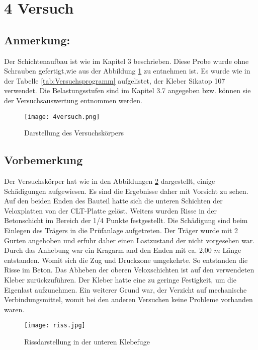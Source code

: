 \documentclass[12 pt,a4 paper ]{scrreprt}
\begin{document}
\clearpage
\newpage
\section{4 Versuch}

\subsection{Anmerkung:}
Der Schichtenaufbau ist wie im Kapitel 3 beschrieben. Diese Probe wurde ohne Schrauben gefertigt,wie aus der Abbildung \ref{4versuch} zu entnehmen ist. Es wurde wie in der Tabelle \ref{tab:Versuchsprogramm}  aufgelistet, der Kleber Sikatop 107 verwendet. Die Belastungsstufen sind im Kapitel 3.7 angegeben bzw. können sie der Versuchsauswertung entnommen werden.

\begin{figure}[h]
\begin{center}
\texttt{[image: 4versuch.png]}
\caption{Darstellung des Versuchskörpers}
\label{4versuch}
\end{center}
\end{figure}

\subsection{Vorbemerkung}

Der Versuchskörper hat wie in den Abbildungen \ref{riss} dargestellt, einige Schädigungen aufgewiesen. Es sind die Ergebnisse daher mit Vorsicht zu sehen. Auf den beiden Enden des Bauteil hatte sich die unteren Schichten der Veloxplatten von der CLT-Platte gelöst. Weiters wurden Risse in der Betonschicht im Bereich der 1/4 Punkte festgestellt.
Die Schädigung sind beim Einlegen des Trägers in die Prüfanlage aufgetreten. Der Träger wurde mit 2 Gurten angehoben und erfuhr daher einen Lastzustand der nicht vorgesehen war. Durch das Anhebung war ein Kragarm and den Enden  mit ca. 2,00 $m$ Länge entstanden. Womit sich die Zug und Druckzone umgekehrte. So entstanden die Risse im Beton. Das Abheben der oberen Veloxschichten ist auf den verwendeten Kleber zurückzuführen. Der Kleber hatte eine zu geringe Festigkeit, um die Eigenlast aufzunehmen. Ein weiterer Grund war, der Verzicht auf mechanische Verbindungsmittel, womit bei den anderen Versuchen keine Probleme vorhanden waren.

\begin{figure}
\begin{center}
\texttt{[image: riss.jpg]}
\caption{Rissdarstellung in der unteren Klebefuge}
\label{riss}
\end{center}
\end{figure}
\end{document}
